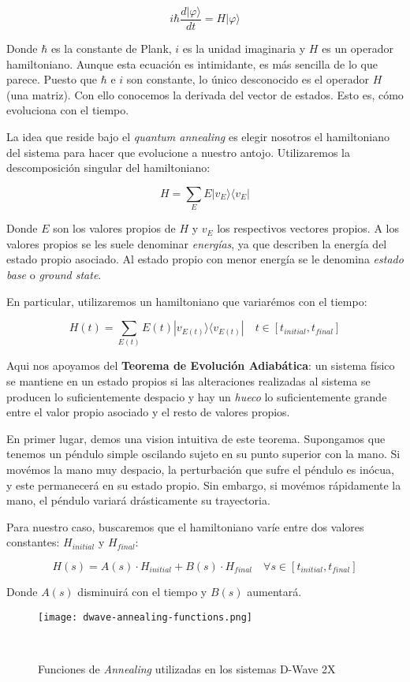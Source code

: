 \documentclass[11pt]{article}
\newcommand*{\ra}{\rangle}
\newcommand*{\la}{\langle}
\begin{document}
\[ i \hbar \frac{d|\varphi\ra}{dt} = H|\varphi\ra \]

Donde $\hbar$ es la constante de Plank, $i$ es la unidad imaginaria y $H$ es un operador hamiltoniano. Aunque esta ecuación es intimidante, es más sencilla de lo que parece. Puesto que $\hbar$ e $i$ son constante, lo único desconocido es el operador $H$ (una matriz). Con ello conocemos la derivada del vector de estados. Esto es, cómo evoluciona con el tiempo.

La idea que reside bajo el \emph{quantum annealing} es elegir nosotros el hamiltoniano del sistema para hacer que evolucione a nuestro antojo. Utilizaremos la descomposición singular del hamiltoniano:

$$ H = \sum_E E |v_E\ra\la v_E| $$

Donde $E$ son los valores propios de $H$ y $v_E$ los respectivos vectores propios. A los valores propios se les suele denominar \emph{energías}, ya que describen la energía del estado propio asociado. Al estado propio con menor energía se le denomina \emph{estado base} o \emph{ground state}.

En particular, utilizaremos un hamiltoniano que variarémos con el tiempo:

$$ H(t) = \sum_{E(t)} E(t) |v_{E(t)}\ra\la v_{E(t)}| \quad t \in [t_{initial}, t_{final}]$$

Aqui nos apoyamos del \textbf{Teorema de Evolución Adiabática}: un sistema físico se mantiene en un estado propios si las alteraciones realizadas al sistema se producen lo suficientemente despacio y hay un \emph{hueco} lo suficientemente grande entre el valor propio asociado y el resto de valores propios.

En primer lugar, demos una vision intuitiva de este teorema. Supongamos que tenemos un péndulo simple oscilando sujeto en su punto superior con la mano. Si movémos la mano muy despacio, la perturbación que sufre el péndulo es inócua, y este permanecerá en su estado propio. Sin embargo, si movémos rápidamente la mano, el péndulo variará drásticamente su trayectoria.

Para nuestro caso, buscaremos que el hamiltoniano varíe entre dos valores constantes: $H_{initial}$ y $H_{final}$:

$$ H(s) = A(s) \cdot H_{initial} + B(s) \cdot H_{final} \quad \forall s \in [t_{initial}, t_{final}] $$

Donde $A(s)$ disminuirá con el tiempo y $B(s)$ aumentará.

\begin{figure}[h]
	\texttt{[image: dwave-annealing-functions.png]}
	\centering
	\caption{Funciones de \emph{Annealing} utilizadas en los sistemas D-Wave 2X}\
\end{figure}
\end{document}
